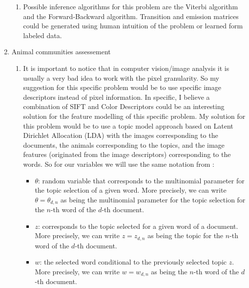 \documentclass{article}
\begin{document}
\begin{enumerate}
\begin{enumerate}
\item
Possible inference algorithms for this problem are the Viterbi algorithm and the Forward-Backward algorithm. Transition and emission matrices could be generated using human intuition of the problem or learned form labeled data.
\end{enumerate}



\item
Animal communities assessement\\

\begin{enumerate}
\item
It is important to notice that in computer vision/image analysis it is usually a very bad idea to work with the pixel granularity. So my suggestion for this specific problem would be to use specific image descriptors instead of pixel information. In specific, I believe a combination of SIFT and Color Descriptors could be an interesting solution for the feature modelling of this specific problem. My solution for this problem would be to use a topic model approach based on Latent Dirichlet Allocation (LDA) with the images corresponding to the documents, the animals corresponding to the topics, and the image features (originated from the image descriptors) corresponding to the words. So for our variables we will use the same notation from \cite{lda}:
\begin{itemize}
\item
$\theta$: random variable that corresponds to the multinomial parameter for the topic selection of a given word. More precisely, we can write $\theta = \theta_{d,n}$ as being the multinomial parameter for the topic selection for the $n$-th word of the $d$-th document.
\item
$z$: corresponds to the topic selected for a given word of a document. More precisely, we can write $z = z_{d,n}$ as being the topic for the $n$-th word of the $d$-th document.
\item
$w$: the selected word conditional to the previously selected topic $z$. More precisely, we can write $w = w_{d,n}$ as being the $n$-th word of the $d$-th document.


\end{itemize}
\end{enumerate}
\end{enumerate}
\end{document}
